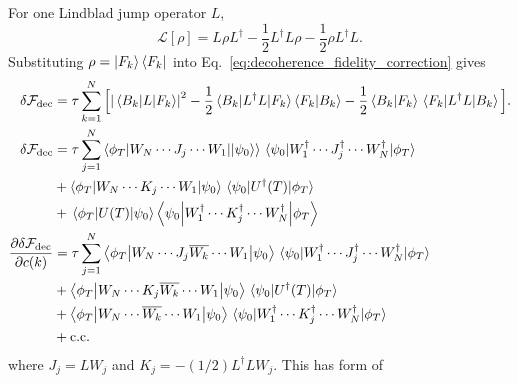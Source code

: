 \documentclass{notes2}
\newcommand{\dvbar}[1]{\overline{#1}}
\begin{document}
For one Lindblad jump operator $L$,
\begin{equation}
    \mathcal{L}[\rho]
    =
    L\rho L^\dagger
    -
    \frac{1}{2}L^\dagger L\rho
    -
    \frac{1}{2}\rho L^\dagger L .
\end{equation}
Substituting $\rho=\ket{F_k}\bra{F_k}$ into
Eq.~\eqref{eq:decoherence_fidelity_correction} gives
\begin{align}
    \delta \mathcal{F}_{\mathrm{dec}}
    &=
    \tau
    \sum_{k=1}^{N}
    \Big[
    \abs{\mel{B_k}{L}{F_k}}^2
        -
        \frac{1}{2}
        \mel{B_k}{L^\dagger L}{F_k}
        \braket{F_k}{B_k}
        -
        \frac{1}{2}
        \braket{B_k}{F_k}
        \mel{F_k}{L^\dagger L}{B_k}
    \Big].
    \label{eq:single_lindblad_decoherence_fidelity}\\
    \delta \mathcal{F}_{\mathrm{dec}} &= \tau \sum_{j=1}^{N} \mel**{\phi_T}{W_N\cdots J_j \cdots W_1}{\ket{\psi_0}}\mel{\psi_0}{W_1^\dagger \cdots J_j^\dagger \cdots W_N^\dagger}{\phi_T} \\
    &+\mel**{\phi_T}{W_N\cdots K_j\cdots W_1}{\psi_0}\mel{\psi_0}{U^\dagger(T)}{\phi_T}\notag\\
     &+\mel{\phi_T}{U(T)}{\psi_0}\mel**{\psi_0}{W_1^\dagger \cdots K_j^\dagger \cdots W_N^\dagger}{\phi_T}\notag\\
     \pdv{\delta \mathcal{F}_{\mathrm{dec}}}{c(k)} &= \tau \sum_{j=1}^{N}\mel**{\phi_T}{W_N\cdots J_j \dvbar{W_k} \cdots W_1}{\psi_0}\mel{\psi_0}{W_1^\dagger \cdots J_j^\dagger \cdots W_N^\dagger}{\phi_T} \\ 
     &+ \mel**{\phi_T}{W_N\cdots K_j \dvbar{W_k} \cdots W_1}{\psi_0}\mel{\psi_0}{U^\dagger(T)}{\phi_T}\notag\\
     &+\mel**{\phi_T}{W_N\cdots \dvbar{W_k} \cdots W_1}{\psi_0}\mel{\psi_0}{W_1^\dagger \cdots K_j^\dagger \cdots W_N^\dagger}{\phi_T} \notag\\
     &+\text{c.c.}
\end{align}
where $J_j = L W_j$ and $K_j = -(1/2)L^\dagger L W_j$. This has form of
\end{document}
